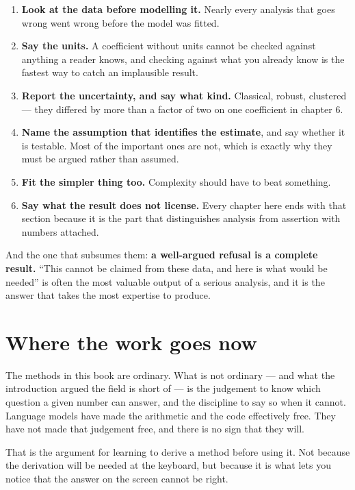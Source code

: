 \documentclass[
  letterpaper,
  10pt,
  twoside,
  openright,
  numbers=noenddot,
  chapterprefix=true]{scrbook}
\providecommand{\tightlist}{%
  \setlength{\itemsep}{0pt}\setlength{\parskip}{0pt}}
\begin{document}
\begin{enumerate}
\def\labelenumi{\arabic{enumi}.}
\tightlist
\item
  \textbf{Look at the data before modelling it.} Nearly every analysis
  that goes wrong went wrong before the model was fitted.
\item
  \textbf{Say the units.} A coefficient without units cannot be checked
  against anything a reader knows, and checking against what you already
  know is the fastest way to catch an implausible result.
\item
  \textbf{Report the uncertainty, and say what kind.} Classical, robust,
  clustered --- they differed by more than a factor of two on one
  coefficient in chapter 6.
\item
  \textbf{Name the assumption that identifies the estimate}, and say
  whether it is testable. Most of the important ones are not, which is
  exactly why they must be argued rather than assumed.
\item
  \textbf{Fit the simpler thing too.} Complexity should have to beat
  something.
\item
  \textbf{Say what the result does not license.} Every chapter here ends
  with that section because it is the part that distinguishes analysis
  from assertion with numbers attached.
\end{enumerate}

And the one that subsumes them: \textbf{a well-argued refusal is a
complete result.} ``This cannot be claimed from these data, and here is
what would be needed'' is often the most valuable output of a serious
analysis, and it is the answer that takes the most expertise to produce.

\section{Where the work goes now}\label{where-the-work-goes-now}

The methods in this book are ordinary. What is not ordinary --- and what
the introduction argued the field is short of --- is the judgement to
know which question a given number can answer, and the discipline to say
so when it cannot. Language models have made the arithmetic and the code
effectively free. They have not made that judgement free, and there is
no sign that they will.

That is the argument for learning to derive a method before using it.
Not because the derivation will be needed at the keyboard, but because
it is what lets you notice that the answer on the screen cannot be
right.
\end{document}
